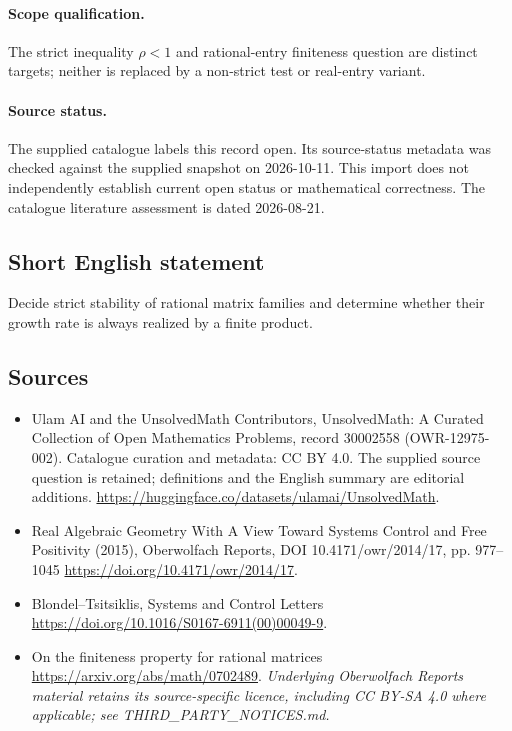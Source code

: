 \documentclass[11pt]{article}
\begin{document}
\paragraph{Scope qualification.}
The strict inequality $\rho<1$ and rational-entry finiteness question are distinct targets; neither is replaced by a non-strict test or real-entry variant.
\paragraph{Source status.}
The supplied catalogue labels this record open. Its source-status metadata was checked against the supplied snapshot on 2026-10-11. This import does not independently establish current open status or mathematical correctness. The catalogue literature assessment is dated 2026-08-21.
\subsection{Short English statement}
Decide strict stability of rational matrix families and determine whether their growth rate is always realized by a finite product.
\subsection{Sources}
\begin{itemize}
\item[S1] Ulam AI and the UnsolvedMath Contributors, UnsolvedMath: A Curated Collection of Open Mathematics Problems, record 30002558 (OWR-12975-002). Catalogue curation and metadata: CC BY 4.0. The supplied source question is retained; definitions and the English summary are editorial additions.
\url{https://huggingface.co/datasets/ulamai/UnsolvedMath}.
\item[S2] Real Algebraic Geometry With A View Toward Systems Control and Free Positivity (2015), Oberwolfach Reports, DOI 10.4171/owr/2014/17, pp. 977--1045
\url{https://doi.org/10.4171/owr/2014/17}.
\item[S3] Blondel--Tsitsiklis, Systems and Control Letters
\url{https://doi.org/10.1016/S0167-6911(00)00049-9}.
\item[S4] On the finiteness property for rational matrices
\url{https://arxiv.org/abs/math/0702489}.
\textit{Underlying Oberwolfach Reports material retains its source-specific licence, including CC BY-SA 4.0 where applicable; see THIRD\_PARTY\_NOTICES.md.}
\end{itemize}
\end{document}
